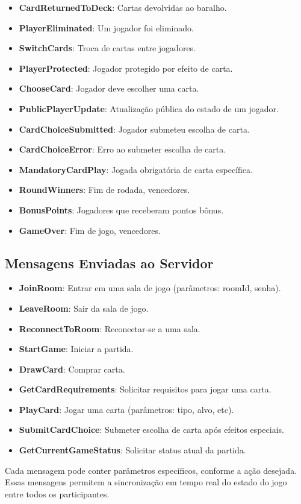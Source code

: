 \begin{itemize}
    \item \textbf{CardReturnedToDeck}: Cartas devolvidas ao baralho.
    \item \textbf{PlayerEliminated}: Um jogador foi eliminado.
    \item \textbf{SwitchCards}: Troca de cartas entre jogadores.
    \item \textbf{PlayerProtected}: Jogador protegido por efeito de carta.
    \item \textbf{ChooseCard}: Jogador deve escolher uma carta.
    \item \textbf{PublicPlayerUpdate}: Atualização pública do estado de um jogador.
    \item \textbf{CardChoiceSubmitted}: Jogador submeteu escolha de carta.
    \item \textbf{CardChoiceError}: Erro ao submeter escolha de carta.
    \item \textbf{MandatoryCardPlay}: Jogada obrigatória de carta específica.
    \item \textbf{RoundWinners}: Fim de rodada, vencedores.
    \item \textbf{BonusPoints}: Jogadores que receberam pontos bônus.
    \item \textbf{GameOver}: Fim de jogo, vencedores.
\end{itemize}

\subsection{Mensagens Enviadas ao Servidor}
\begin{itemize}
    \item \textbf{JoinRoom}: Entrar em uma sala de jogo (parâmetros: roomId, senha).
    \item \textbf{LeaveRoom}: Sair da sala de jogo.
    \item \textbf{ReconnectToRoom}: Reconectar-se a uma sala.
    \item \textbf{StartGame}: Iniciar a partida.
    \item \textbf{DrawCard}: Comprar carta.
    \item \textbf{GetCardRequirements}: Solicitar requisitos para jogar uma carta.
    \item \textbf{PlayCard}: Jogar uma carta (parâmetros: tipo, alvo, etc).
    \item \textbf{SubmitCardChoice}: Submeter escolha de carta após efeitos especiais.
    \item \textbf{GetCurrentGameStatus}: Solicitar status atual da partida.
\end{itemize}

Cada mensagem pode conter parâmetros específicos, conforme a ação desejada. Essas mensagens permitem a sincronização em tempo real do estado do jogo entre todos os participantes.


